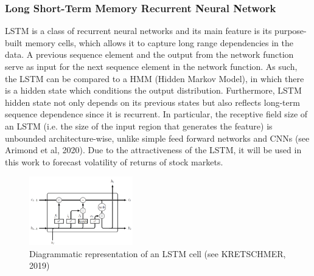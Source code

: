 \documentclass[a4paper,11pt,oneside]{book}
\begin{document}
\subsubsection{Long Short-Term Memory Recurrent Neural Network}
LSTM is a class of recurrent neural networks and its main feature is its purpose-built memory cells, which allows it to capture long range dependencies in the data.\newline\newline
A previous sequence element and the output from the network function serve as input for the next sequence element in the network function. As such, the LSTM can be compared to a HMM (Hidden Markov Model), in which there is a hidden state which conditions the output distribution. Furthermore, LSTM hidden state not only depends on its previous states but also reflects long-term sequence dependence since it is recurrent. In particular, the receptive field size of an LSTM (i.e. the size of the input region that generates the feature) is unbounded architecture-wise, unlike simple feed forward networks and CNNs (see Arimond et al, 2020). Due to the attractiveness of the LSTM, it will be used in this work to forecast volatility of returns of stock markets. 

\begin{figure}[h]
	\centering
	\includegraphics[width=0.4\textwidth]{figures/lstm}
	\caption{Diagrammatic representation of an LSTM cell  (see KRETSCHMER, 2019)}
	
	\label{lstm}
\end{figure}
\end{document}
